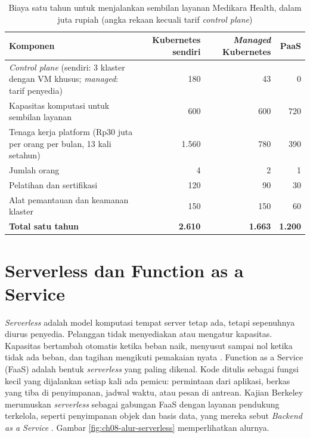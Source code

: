 \begin{table}[!htb]
  \centering
  \caption{Biaya satu tahun untuk menjalankan sembilan layanan Medikara Health, dalam juta rupiah
           (angka rekaan kecuali tarif \textit{control plane})}
  \label{tab:ch08-biaya-runtime}
  \footnotesize
  \begin{tabularx}{\textwidth}{>{\raggedright\arraybackslash}X r r r}
    \hline
    \textbf{Komponen} & \textbf{Kubernetes sendiri} & \textbf{\textit{Managed} Kubernetes} &
      \textbf{PaaS} \\ \hline
    \textit{Control plane} (sendiri: 3 klaster dengan VM khusus; \textit{managed}: tarif
      penyedia) & 180 & 43 & 0 \\ \hline
    Kapasitas komputasi untuk sembilan layanan & 600 & 600 & 720 \\ \hline
    Tenaga kerja platform (Rp30 juta per orang per bulan, 13 kali setahun) & 1.560 & 780 & 390 \\ \hline
    \quad Jumlah orang & 4 & 2 & 1 \\ \hline
    Pelatihan dan sertifikasi & 120 & 90 & 30 \\ \hline
    Alat pemantauan dan keamanan klaster & 150 & 150 & 60 \\ \hline
    \textbf{Total satu tahun} & \textbf{2.610} & \textbf{1.663} & \textbf{1.200} \\ \hline
  \end{tabularx}
\end{table}

\section{Serverless dan Function as a Service}
\label{sec:ch08-serverless}

\textit{Serverless} adalah model komputasi tempat server tetap ada, tetapi sepenuhnya diurus
penyedia. Pelanggan tidak menyediakan atau mengatur kapasitas. Kapasitas bertambah otomatis ketika
beban naik, menyusut sampai nol ketika tidak ada beban, dan tagihan mengikuti pemakaian nyata
\cite{c08-cncf-serverless}. Function as a Service (FaaS) adalah bentuk \textit{serverless} yang
paling dikenal. Kode ditulis sebagai fungsi kecil yang dijalankan setiap kali ada pemicu: permintaan
dari aplikasi, berkas yang tiba di penyimpanan, jadwal waktu, atau pesan di antrean. Kajian
Berkeley merumuskan \textit{serverless} sebagai gabungan FaaS dengan layanan pendukung terkelola,
seperti penyimpanan objek dan basis data, yang mereka sebut \textit{Backend as a Service}
\cite{c08-jonas2019}. Gambar \ref{fig:ch08-alur-serverless} memperlihatkan alurnya.


